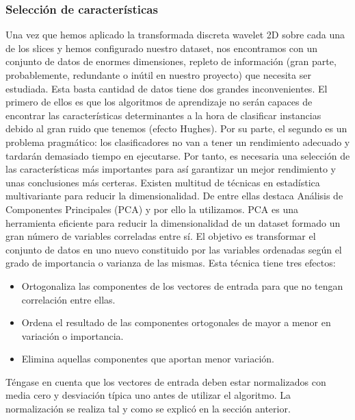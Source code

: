 \newpage

\subsubsection{Selección de características}

Una vez que hemos aplicado la transformada discreta wavelet 2D sobre cada una de los slices y hemos configurado nuestro dataset, nos encontramos con un conjunto de datos de enormes dimensiones, repleto de información (gran parte, probablemente, redundante o inútil en nuestro proyecto) que necesita ser estudiada. Esta basta cantidad de datos tiene dos grandes inconvenientes. El primero de ellos es que los algoritmos de aprendizaje no serán capaces de encontrar las características determinantes a la hora de clasificar instancias debido al gran ruido que tenemos (efecto Hughes). Por su parte, el segundo es un problema pragmático: los clasificadores no van a tener un rendimiento adecuado y tardarán demasiado tiempo en ejecutarse. Por tanto, es necesaria una selección de las características más importantes para así garantizar un mejor rendimiento y unas conclusiones más certeras. Existen multitud de técnicas en estadística multivariante para reducir la dimensionalidad. De entre ellas destaca Análisis de Componentes Principales (PCA) y por ello la utilizamos. PCA es una herramienta eficiente para reducir la dimensionalidad de un dataset formado un gran número de variables correladas entre sí. El objetivo es transformar el conjunto de datos en uno nuevo constituido por las variables ordenadas según el grado de importancia o varianza de las mismas. Esta técnica tiene tres efectos:

\begin{itemize}
	\item Ortogonaliza las componentes de los vectores de entrada para que no tengan correlación entre ellas.
	\item Ordena el resultado de las componentes ortogonales de mayor a menor en variación o importancia.
	\item Elimina aquellas componentes que aportan menor variación.
\end{itemize}

Téngase en cuenta que los vectores de entrada deben estar normalizados con media cero y desviación típica uno antes de utilizar el algoritmo. La normalización se realiza tal y como se explicó en la sección anterior. \\

